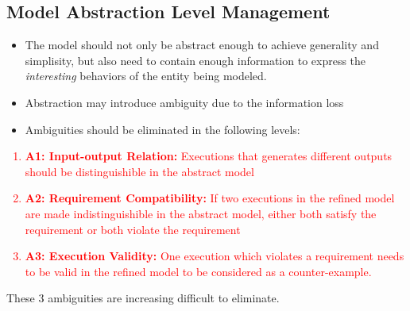 \documentclass{llncs}
\begin{document}
\subsection{Model Abstraction Level Management}
\begin{itemize}
	\item The model should not only be abstract enough to achieve generality and simplisity, but also need to contain enough information to express the \emph{interesting} behaviors of the entity being modeled.
    \item Abstraction may introduce ambiguity due to the information loss
    \item Ambiguities should be eliminated in the following levels:
\end{itemize}
\textcolor{red}{
\begin{enumerate}
	\item \textbf{A1: Input-output Relation: }Executions that generates different outputs should be distinguishible in the abstract model
    \item \textbf{A2: Requirement Compatibility: }If two executions in the refined model are made indistinguishible in the abstract model, either both satisfy the requirement or both violate the requirement
    \item \textbf{A3: Execution Validity: }One execution which violates a requirement needs to be valid in the refined model to be considered as a counter-example.
\end{enumerate}}
These 3 ambiguities are increasing difficult to eliminate.
\end{document}
